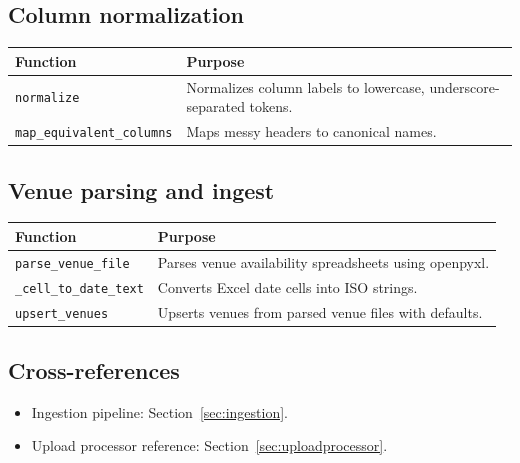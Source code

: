 \subsection{Column normalization}
\label{subsec:backend:utils:columns}

\begin{longtable}{p{}p{}}
\toprule
\textbf{Function} & \textbf{Purpose} \\
\midrule
\texttt{normalize} & Normalizes column labels to lowercase, underscore-separated tokens. \\
\texttt{map\_equivalent\_columns} & Maps messy headers to canonical names. \\
\bottomrule
\end{longtable}

\subsection{Venue parsing and ingest}
\label{subsec:backend:utils:venues}

\begin{longtable}{p{}p{}}
\toprule
\textbf{Function} & \textbf{Purpose} \\
\midrule
\texttt{parse\_venue\_file} & Parses venue availability spreadsheets using openpyxl. \\
\texttt{\_cell\_to\_date\_text} & Converts Excel date cells into ISO strings. \\
\texttt{upsert\_venues} & Upserts venues from parsed venue files with defaults. \\
\bottomrule
\end{longtable}

\subsection{Cross-references}
\label{subsec:backend:utils:links}

\begin{itemize}
  \item Ingestion pipeline: Section~\ref{sec:ingestion}.
  \item Upload processor reference: Section~\ref{sec:uploadprocessor}.
\end{itemize}
